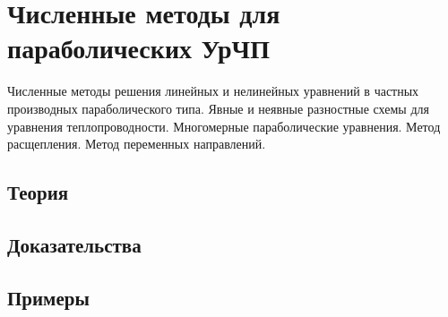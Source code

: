 
\section{Численные методы для параболических УрЧП}
\label{sec:2.1.14-fd-parabolic}

\begin{ticket}
Численные методы решения линейных и нелинейных уравнений в частных производных параболического типа. Явные и неявные разностные схемы для уравнения теплопроводности. Многомерные параболические уравнения. Метод расщепления. Метод переменных направлений.
\end{ticket}

\subsection*{Теория}

\subsection*{Доказательства}

\subsection*{Примеры}
